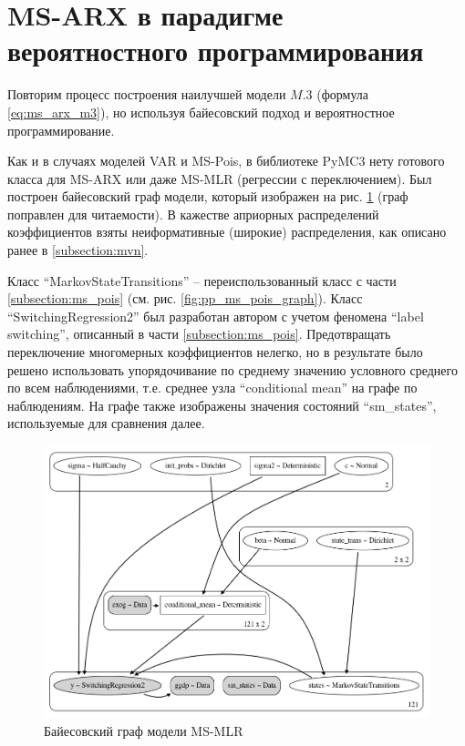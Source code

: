 \documentclass[a4paper,14pt]{extreport}
\begin{document}
\section{MS-ARX в парадигме вероятностного программирования}

Повторим процесс построения наилучшей модели $M.3$ (формула \ref{eq:ms_arx_m3}), но используя байесовский подход и вероятностное программирование.

Как и в случаях моделей VAR и MS-Pois, в библиотеке PyMC3 нету готового класса для MS-ARX или даже MS-MLR (регрессии с переключением). Был построен байесовский граф модели, который изображен на рис. \ref{fig:pp_ms_arx_graph_man} (граф поправлен для читаемости). В кажестве априорных распределений коэффициентов взяты неиформативные (широкие) распределения, как описано ранее в \ref{subsection:mvn}.

Класс ``MarkovStateTransitions'' -- переиспользованный класс с части \ref{subsection:ms_pois} (см. рис. \ref{fig:pp_ms_pois_graph}). 
Класс ``SwitchingRegression2'' был разработан автором с учетом феномена ``label switching'', описанный в части \ref{subsection:ms_pois}. Предотвращать переключение многомерных коэффициентов нелегко, но в результате было решено использовать упорядочивание по среднему значению условного среднего по всем наблюдениями, т.е. среднее узла ``conditional mean'' на графе по наблюдениям.
На графе также изображены значения состояний ``sm\_states'', используемые для сравнения далее.

\begin{figure}[H]
	\includegraphics[width=\linewidth]{img/manual/pp_ms_arx_graph_man.png}
	\caption{Байесовский граф модели MS-MLR}
	\label{fig:pp_ms_arx_graph_man}
\end{figure}
\end{document}
